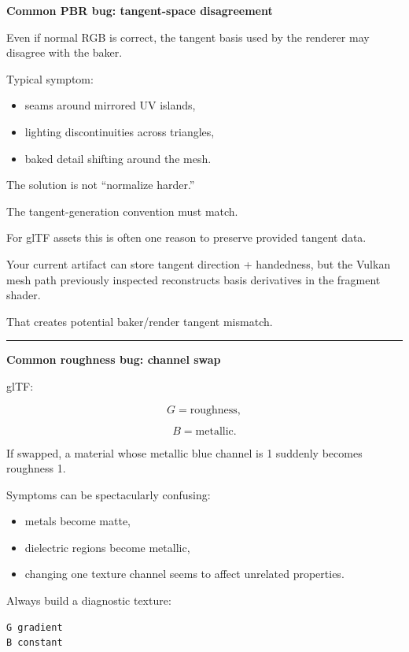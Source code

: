 \textbf{Common PBR bug: tangent-space disagreement}

Even if normal RGB is correct, the tangent basis used by the renderer may disagree with the baker.

Typical symptom:

\begin{itemize}
\tightlist
\item
  seams around mirrored UV islands,
\item
  lighting discontinuities across triangles,
\item
  baked detail shifting around the mesh.
\end{itemize}

The solution is not ``normalize harder.''

The tangent-generation convention must match.

For glTF assets this is often one reason to preserve provided tangent data.

Your current artifact can store tangent direction + handedness, but the Vulkan mesh path previously inspected reconstructs basis derivatives in the fragment shader.

That creates potential baker/render tangent mismatch.

\begin{center}\rule{0.5\linewidth}{0.5pt}\end{center}

\textbf{Common roughness bug: channel swap}

glTF:

\[
G=\text{roughness},
\]

\[
B=\text{metallic}.
\]

If swapped, a material whose metallic blue channel is 1 suddenly becomes roughness 1.

Symptoms can be spectacularly confusing:

\begin{itemize}
\tightlist
\item
  metals become matte,
\item
  dielectric regions become metallic,
\item
  changing one texture channel seems to affect unrelated properties.
\end{itemize}

Always build a diagnostic texture:

\begin{verbatim}
G gradient
B constant
\end{verbatim}

